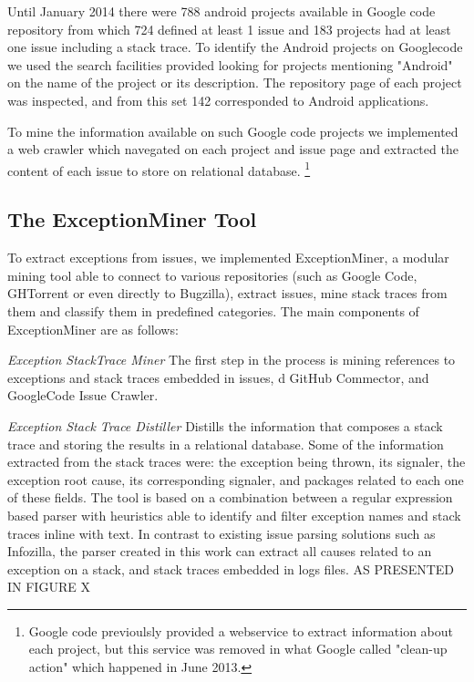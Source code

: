 \documentclass[conference]{IEEEtran}
\begin{document}
Until January 2014 there were 788 android projects available in Google code repository from which 724 defined at least 1 issue and 183 projects 
had at least one issue including a stack trace. To identify the Android projects on Googlecode we used the search facilities provided looking for 
projects mentioning "Android" on the name of the project or its description. The repository page of each project was inspected, and from this set
142 corresponded to Android applications.

To mine the information available on such Google code projects we implemented a web crawler which navegated on each project and issue page
and extracted the content of each issue to store on relational database. \footnote{Google code previoulsly provided a webservice to extract information about each project, but this service was removed in what Google called "clean-up action" which happened in June 2013.}

\subsection{The ExceptionMiner Tool}
\label{sec:exceptionminer}

To extract exceptions from issues, we implemented ExceptionMiner, a modular
mining tool able to connect to various repositories (such as Google Code,
GHTorrent or even directly to Bugzilla), extract issues, mine stack traces from
them and classify them in predefined categories. The main components of
ExceptionMiner are as follows:

\noindent\emph{Exception StackTrace Miner} The first step in the process is
mining references to exceptions and stack traces embedded in issues, d
GitHub Commector, and GoogleCode Issue Crawler.

\noindent\emph{Exception Stack Trace Distiller} 
Distills the information that composes a stack trace and storing the results in a
relational database. Some of the information extracted from the stack traces were:
 the exception being thrown, its signaler, the exception root cause, its corresponding signaler,
and packages related to each one of these fields.
The tool is based on a combination between a regular expression based parser 
with heuristics able to identify and filter exception names and stack traces inline with text. In
contrast to existing issue parsing solutions such as Infozilla, the parser
created in this work can extract all causes related to an exception on a stack,
and stack traces embedded in logs files.
AS PRESENTED IN FIGURE X
\end{document}
